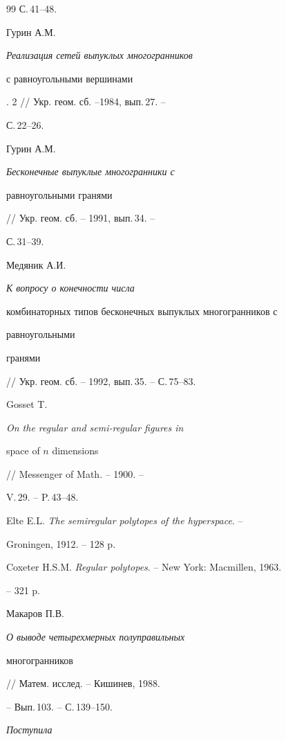 \begin{thebibliography}{99}
С.\,41--48. 




Гурин А.М. {\em Реализация сетей выпуклых многогранников 


с равноугольными вершинами}. 2 // Укр. геом. сб. --1984, вып.\,27. -- 


С.\,22--26. 




Гурин А.М. {\em Бесконечные выпуклые многогранники с 


равноугольными гранями} // Укр. геом. сб. -- 1991, вып.\,34. -- 


С.\,31--39. 




Медяник А.И. {\em К вопросу о конечности числа 


комбинаторных типов бесконечных выпуклых многогранников с 


равноугольными 


гранями} // Укр. геом. сб. -- 1992, вып.\,35. -- С.\,75--83.  




Gosset T. {\em On the regular and semi-regular figures in 


space of $n$ dimensions} // Messenger of Math. -- 1900. -- 


V.\,29. -- P.\,43--48.




Elte E.L. {\em The semiregular polytopes of the hyperspace}. -- 


Groningen, 1912. -- 128 p.




Coxeter H.S.M. {\em Regular polytopes}. -- New York: Macmillen, 1963.


-- 321 p.




Макаров П.В. {\em О выводе четырехмерных полуправильных 


многогранников} // Матем. исслед. -- Кишинев, 1988. 


-- Вып.\,103. -- С.\,139--150. 


 


\end{thebibliography} 


 


\vskip 2cm 


 


% 


{\it Поступила} 




\label{end} 


 


 


